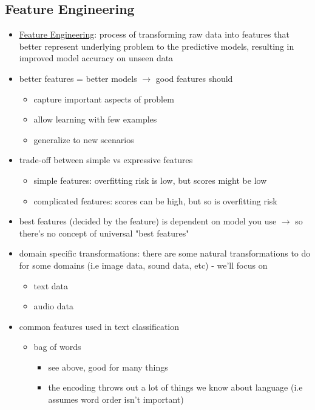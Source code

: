 \documentclass[10.5pt,a4paper, fleqn, dvipsnames]{article}
\begin{document}
\subsection*{Feature Engineering}
\begin{itemize}
    \item \ul{Feature Engineering}: process of transforming raw data into features that better represent underlying problem to the predictive models, resulting in improved model accuracy on unseen data
    \item better features = better models $\rightarrow$ good features should
    \begin{itemize}
        \item capture important aspects of problem
        \item allow learning with few examples
        \item generalize to new scenarios
    \end{itemize}
    \item trade-off between simple vs expressive features
    \begin{itemize}
        \item simple features: overfitting risk is low, but scores might be low
        \item complicated features: scores can be high, but so is overfitting risk 
    \end{itemize}
    \item best features (decided by the feature) is dependent on model you use $\rightarrow$ so there's no concept of universal "best features"
    \item domain specific transformations: there are some natural transformations to do for some domains (i.e image data, sound data, etc) - we'll focus on 
    \begin{itemize}
        \item text data
        \item audio data
    \end{itemize}
    \item common features used in text classification
    \begin{itemize}
        \item bag of words
        \begin{itemize}[leftmargin = 2em]
            \item see above, good for many things
            \item the encoding throws out a lot of things we know about language (i.e assumes word order isn't important)

\end{itemize}
\end{itemize}
\end{itemize}
\end{document}
